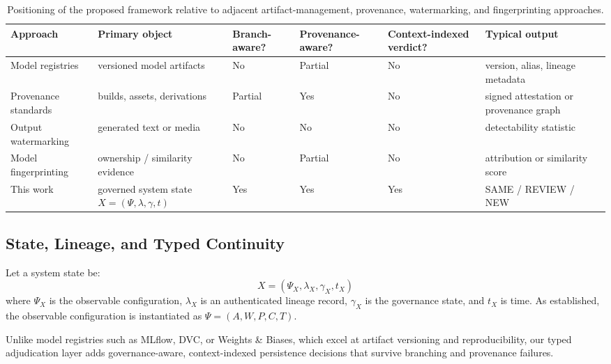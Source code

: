 \documentclass[11pt,a4paper]{article}
\begin{document}
\begin{table}[t]
\centering
\small
\begin{tabular}{p{2.7cm}p{3.1cm}p{1.8cm}p{1.8cm}p{2.2cm}p{3.1cm}}
\toprule
Approach & Primary object & Branch-aware? & Provenance-aware? & Context-indexed verdict? & Typical output \\
\midrule
Model registries & versioned model artifacts & No & Partial & No & version, alias, lineage metadata \\
Provenance standards & builds, assets, derivations & Partial & Yes & No & signed attestation or provenance graph \\
Output watermarking & generated text or media & No & No & No & detectability statistic \\
Model fingerprinting & ownership / similarity evidence & No & Partial & No & attribution or similarity score \\
This work & governed system state \(X=(\Psi,\lambda,\gamma,t)\) & Yes & Yes & Yes & SAME / REVIEW / NEW \\
\bottomrule
\end{tabular}
\caption{Positioning of the proposed framework relative to adjacent artifact-management, provenance, watermarking, and fingerprinting approaches.}
\label{tab:positioning}
\end{table}

\subsection{State, Lineage, and Typed Continuity}
Let a system state be:
\begin{equation}
X = (\Psi_X, \lambda_X, \gamma_X, t_X)
\end{equation}
where \(\Psi_X\) is the observable configuration, \(\lambda_X\) is an authenticated lineage record, \(\gamma_X\) is the governance state, and \(t_X\) is time. As established, the observable configuration is instantiated as \(\Psi = (A, W, P, C, T)\).

Unlike model registries such as MLflow, DVC, or Weights \& Biases, which excel at artifact versioning and reproducibility, our typed adjudication layer adds governance-aware, context-indexed persistence decisions that survive branching and provenance failures.
\end{document}
